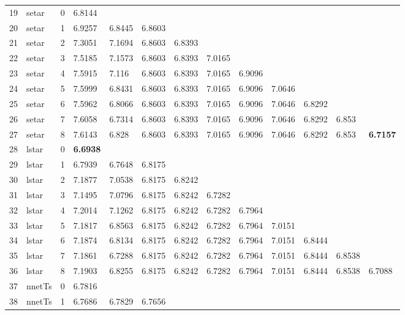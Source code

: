 \documentclass[10pt,a4paper]{article}
\begin{document}
\begin{table}[ht]
\begin{tabular}{rlrllllllllll}
   \hline
19 & setar &     0 & 6.8144 &  &  &  &  &  &  &  &  &  \\ 
  20 & setar &     1 & 6.9257 & 6.8445 & 6.8603 &  &  &  &  &  &  &  \\ 
  21 & setar &     2 & 7.3051 & 7.1694 & 6.8603 & 6.8393 &  &  &  &  &  &  \\ 
  22 & setar &     3 & 7.5185 & 7.1573 & 6.8603 & 6.8393 & 7.0165 &  &  &  &  &  \\ 
  23 & setar &     4 & 7.5915 & 7.116 & 6.8603 & 6.8393 & 7.0165 & 6.9096 &  &  &  &  \\ 
  24 & setar &     5 & 7.5999 & 6.8431 & 6.8603 & 6.8393 & 7.0165 & 6.9096 & 7.0646 &  &  &  \\ 
  25 & setar &     6 & 7.5962 & 6.8066 & 6.8603 & 6.8393 & 7.0165 & 6.9096 & 7.0646 & 6.8292 &  &  \\ 
  26 & setar &     7 & 7.6058 & 6.7314 & 6.8603 & 6.8393 & 7.0165 & 6.9096 & 7.0646 & 6.8292 & 6.853 &  \\ 
  27 & setar &     8 & 7.6143 & 6.828 & 6.8603 & 6.8393 & 7.0165 & 6.9096 & 7.0646 & 6.8292 & 6.853 & \textbf{6.7157} \\ 
   \hline
28 & lstar &     0 & \textbf{6.6938} &  &  &  &  &  &  &  &  &  \\ 
  29 & lstar &     1 & 6.7939 & 6.7648 & 6.8175 &  &  &  &  &  &  &  \\ 
  30 & lstar &     2 & 7.1877 & 7.0538 & 6.8175 & 6.8242 &  &  &  &  &  &  \\ 
  31 & lstar &     3 & 7.1495 & 7.0796 & 6.8175 & 6.8242 & 6.7282 &  &  &  &  &  \\ 
  32 & lstar &     4 & 7.2014 & 7.1262 & 6.8175 & 6.8242 & 6.7282 & 6.7964 &  &  &  &  \\ 
  33 & lstar &     5 & 7.1817 & 6.8563 & 6.8175 & 6.8242 & 6.7282 & 6.7964 & 7.0151 &  &  &  \\ 
  34 & lstar &     6 & 7.1874 & 6.8134 & 6.8175 & 6.8242 & 6.7282 & 6.7964 & 7.0151 & 6.8444 &  &  \\ 
  35 & lstar &     7 & 7.1861 & 6.7288 & 6.8175 & 6.8242 & 6.7282 & 6.7964 & 7.0151 & 6.8444 & 6.8538 &  \\ 
  36 & lstar &     8 & 7.1903 & 6.8255 & 6.8175 & 6.8242 & 6.7282 & 6.7964 & 7.0151 & 6.8444 & 6.8538 & 6.7088 \\ 
   \hline
37 & nnetTs &     0 & 6.7816 &  &  &  &  &  &  &  &  &  \\ 
  38 & nnetTs &     1 & 6.7686 & 6.7829 & 6.7656 &  &  &  &  &  &  &  \\ 

\end{tabular}
\end{table}
\end{document}
